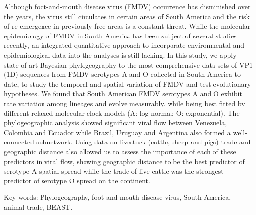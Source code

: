 \documentclass[10pt]{article}
\begin{document}
Although foot-and-mouth disease virus (FMDV) occurrence has disminished over the years, the virus still circulates in certain areas of South America and the risk of re-emergence in previously free areas is a constant threat.
While the molecular epidemiology of FMDV in South America has been subject of several studies recently, an integrated quantitative approach to incorporate environmental and epidemiological data into the analyses is still lacking.
In this study, we apply state-of-art Bayesian phylogeography to the most comprehensive data sets of VP1 (1D) sequences from FMDV serotypes A and O collected in South America to date, to study the temporal and spatial variation of FMDV and test evolutionary hypotheses.
We found that South American FMDV serotypes A and O exhibit rate variation among lineages and evolve measurably, while being best fitted by different relaxed molecular clock models (A: log-normal; O: exponential).
The phylogeographic analysis showed significant viral flow between Venezuela, Colombia and Ecuador while Brazil, Uruguay and Argentina also formed a well-connected subnetwork.
Using data on livestock (cattle, sheep and pigs) trade and geographic distance also allowed us to assess the importance of each of these predictors in viral flow, showing geographic distance to be the best predictor of serotype A spatial spread while the trade of live cattle was the strongest predictor of serotype O spread on the continent.

Key-words: Phylogeography, foot-and-mouth disease virus, South America, animal trade, BEAST.
\end{document}
